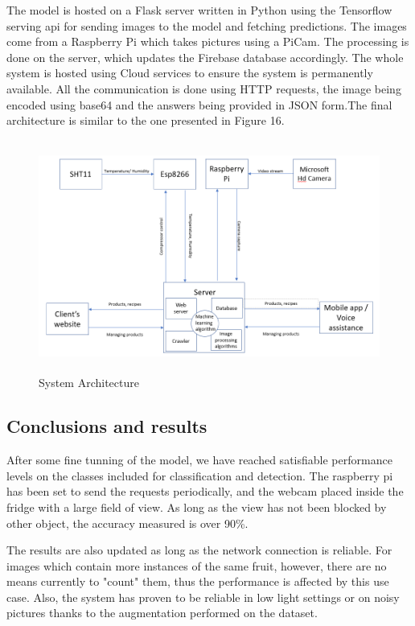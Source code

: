 \documentclass[a4paper,11pt]{article}
\begin{document}
	  	
	  	The model is hosted on a Flask server written in Python using the Tensorflow serving api for sending images to the model and fetching predictions. The images come from a Raspberry Pi which takes pictures using a PiCam. The processing is done on the server, which updates the Firebase database accordingly. The whole system is hosted using Cloud services to ensure the system is permanently available. All the communication is done using HTTP requests, the image being encoded using base64 and the answers being provided in JSON form.The final architecture is similar to the one presented in Figure 16.
	  	 \begin{figure}[H]
	  	 	\includegraphics[height=3in, width=\textwidth]{architecture.png}
	  	 	\caption{System Architecture}
	  	 \end{figure}
	  
	 
	   \subsection{Conclusions and results}
	   
	   After some fine tunning of the model, we have reached satisfiable performance levels on the classes included for classification and detection. The raspberry pi has been set to send the requests periodically, and the webcam placed inside the fridge with a large field of view. As long as the view has not been blocked by other object, the accuracy measured is over 90\%.
	   
	    The results are also updated as long as the network connection is reliable. For images which contain more instances of the same fruit, however, there are no means currently to "count" them, thus the performance is affected by this use case. Also, the system has proven to be reliable in low light settings or on noisy pictures thanks to the augmentation performed on the dataset.
	   
\end{document}
